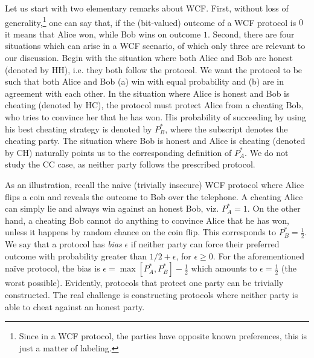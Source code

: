 \documentclass{theoretics}
\begin{document}
Let us start with two elementary remarks about WCF.
%
First, without loss of generality,\footnote{Since in a WCF protocol, the parties have opposite known preferences, this is just a matter of labeling.} one can say that, if
the (bit-valued) outcome of a WCF protocol is $0$ %
it means that Alice won, while Bob wins on outcome $1$. Second, there are four situations which can arise
in a WCF scenario, of which only three are relevant to our discussion. %
Begin with the situation where both Alice and Bob are honest (denoted by HH),
i.e. they both follow the protocol. We want the protocol to
be such that both Alice and Bob (a) win with equal probability and
(b) are in agreement with each other. In the situation where Alice
is honest and Bob is cheating (denoted by HC), the protocol must protect Alice from
a cheating Bob, who tries to convince
her that he has won. His probability of succeeding by
using his best cheating strategy is denoted by $P_{B}^{*}$, where the subscript denotes
the cheating party. The situation
where Bob is honest and Alice is cheating (denoted by CH) naturally points us to the
corresponding definition of $P_{A}^{*}$.  We do not study the CC case, as neither party follows the prescribed protocol.

As an illustration, recall the naïve (trivially insecure) WCF protocol where Alice
flips a coin and reveals the outcome to Bob over the telephone. A cheating
Alice can simply lie and always win against an honest Bob, viz. $P_{A}^{*}=1$. On the other hand, a cheating Bob cannot do anything
to convince Alice that he has won, unless it happens by random chance
on the coin flip. This corresponds to $P_{B}^{*}=\frac{1}{2}$. We say that a protocol has \emph{bias} $\epsilon$ if neither party can force their preferred outcome with probability greater than $1/2+\epsilon$, for $\epsilon\geq 0$. For the aforementioned naïve protocol, the bias is $\epsilon=\max[P_{A}^{*},P_{B}^{*}]-\frac{1}{2}$ which
amounts to $\epsilon=\frac{1}{2}$ (the worst possible). Evidently, protocols that protect one party can be trivially constructed. The real challenge is constructing protocols where neither party is able to cheat against an honest party.
%
%
%
\end{document}
